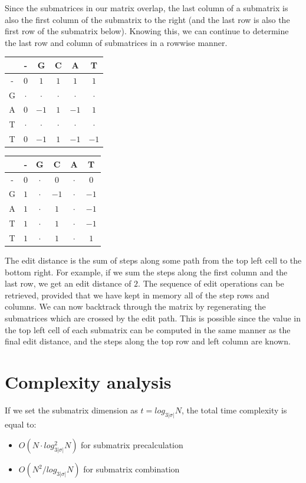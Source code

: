 \documentclass[times, utf8, seminar, numeric]{fer}
\begin{document}
Since the submatrices in our matrix overlap, the last column of a submatrix is also the first column of the submatrix to the right (and the last row is also the first row of the submatrix below). Knowing this, we can continue to determine the last row and column of submatrices in a rowwise manner.

\begin{table}[H]
\centering
\begin{tabular}{c|ccccc}
  & - & G & C & A & T\\
\hline
- & $0$ & $1$ & $1$ & $1$ & $1$ \\
G & $\cdot$ & $\cdot$ & $\cdot$ & $\cdot$ & $\cdot$ \\
A & $0$ & $-1$ & $1$ & $-1$ & $1$ \\
T & $\cdot$ & $\cdot$ & $\cdot$ & $\cdot$ & $\cdot$ \\
T & $0$ & $-1$ & $1$ & $-1$ & $-1$ \\
\end{tabular}
\quad\quad
\begin{tabular}{c|ccccc}
  & - & G & C & A & T\\
\hline
- & $0$ & $\cdot$ & $0$ & $\cdot$ & $0$ \\
G & $1$ & $\cdot$ & $-1$ & $\cdot$ & $-1$ \\
A & $1$ & $\cdot$ & $1$ & $\cdot$ & $-1$ \\
T & $1$ & $\cdot$ & $1$ & $\cdot$ & $-1$ \\
T & $1$ & $\cdot$ & $1$ & $\cdot$ & $1$ \\
\end{tabular}
\end{table}

The edit distance is the sum of steps along some path from the top left cell to the bottom right. For example, if we sum the steps along the first column and the last row, we get an edit distance of $2$. The sequence of edit operations can be retrieved, provided that we have kept in memory all of the step rows and columns. We can now backtrack through the matrix by regenerating the submatrices which are crossed by the edit path. This is possible since the value in the top left cell of each submatrix can be computed in the same manner as the final edit distance, and the steps along the top row and left column are known.

\section{Complexity analysis}
If we set the submatrix dimension as $t = log_{3|\sigma|}N$, the total time complexity is equal to:
\begin{itemize}
\item $O(N \cdot log_{3|\sigma|}^2N)$ for submatrix precalculation
\item $O(N^2 / log_{3|\sigma|}N)$ for submatrix combination
\end{itemize}
\end{document}
